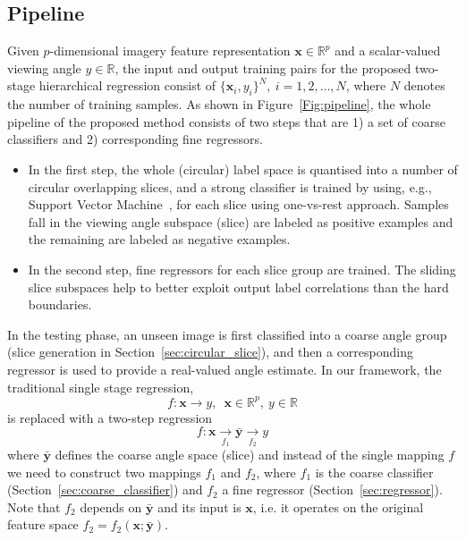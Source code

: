 \documentclass{tutmscthesis}[2010/09/22]
\numberwithin{equation}{section}
\numberwithin{table}{section}
\numberwithin{figure}{section}
\renewcommand{\vec}[1]{\bm{#1}}
\begin{document}
\subsection{Pipeline}
Given $p$-dimensional imagery feature representation
$\vec{x} \in \mathbb{R}^{p}$ and a
scalar-valued viewing angle ${y} \in \mathbb{R}$,  
the input and output training pairs for the proposed two-stage hierarchical
regression consist of $\{\vec{x}_{i}, y_{i}\}^N,~i=1, 2, \ldots,N$,
where $N$ denotes the number of training samples.
As shown in Figure~\ref{Fig:pipeline}, the whole pipeline of the
proposed method consists of two steps that are 1) a set of
coarse classifiers and 2) corresponding fine regressors.  
\begin{itemize}
\item In the first step, the whole (circular) label space is quantised into a number of circular overlapping slices, and a strong classifier is trained by using, e.g., Support Vector Machine~\cite{cortes1995support},
for each slice using one-vs-rest approach. 
Samples fall in the viewing angle subspace (slice) are labeled as positive examples and the remaining are labeled as negative examples.
\item In the second step, fine regressors for each slice group are trained.
  The sliding slice subspaces help to better
  exploit output label correlations than the hard boundaries.
\end{itemize}
In the testing phase, an unseen image is  first classified into a
coarse angle group (slice generation in Section~\ref{sec:circular_slice}), and then a
corresponding regressor
is used to provide a real-valued angle estimate.
In our framework, the traditional single stage regression,
\begin{displaymath}
f: \vec{x} \rightarrow y, \enspace \vec{x} \in \mathbb{R}^p,~y \in \mathbb{R} 
\end{displaymath}
is replaced with a two-step regression
\begin{displaymath}
f: \vec{x} \underset{f_1}{\rightarrow} \bar{\vec{y}} \underset{f_2}{\rightarrow} y
\end{displaymath}
where $\bar{\vec{y}}$ defines the coarse angle space (slice) and
instead of the single mapping $f$ we need to construct two
mappings $f_1$ and $f_2$, where $f_1$ is the coarse classifier
(Section~\ref{sec:coarse_classifier}) and $f_2$ a fine regressor
(Section~\ref{sec:regressor}). Note that $f_2$ depends on
$\bar{\vec{y}}$ and its input is $\vec{x}$, i.e. it operates on
the original feature space $f_2 = f_2(\vec{x}; \bar{\vec{y}})$.
\end{document}
